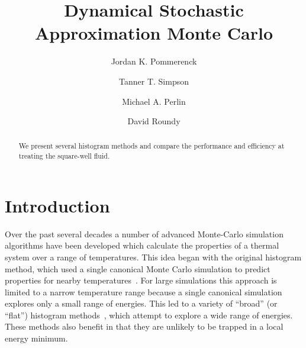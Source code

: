 \documentclass[letterpaper,twocolumn,amsmath,amssymb,pre,aps,10pt]{revtex4-1}
\begin{document}
\title{Dynamical Stochastic Approximation Monte Carlo}

\author{Jordan K. Pommerenck} \author{Tanner T. Simpson}
\author{Michael A. Perlin} \author{David Roundy}

\begin{abstract}
  We present several histogram methods and compare the performance and efficiency at treating the square-well fluid.
\end{abstract}

\maketitle

\section{Introduction}
Over the past several decades a number of advanced Monte-Carlo
simulation algorithms have been developed which calculate the
properties of a thermal system over a range of temperatures.  This
idea began with the original histogram method, which used a single
canonical Monte Carlo simulation to predict properties for nearby
temperatures~\cite{ferrenberg1988new}.  For large simulations this
approach is limited to a narrow temperature range because a single
canonical simulation explores only a small range of energies.  This
led to a variety of ``broad'' (or ``flat'') histogram
methods~\cite{penna1996broad, penna1998broad, swendsen1999transition,
  wang2001determining, wang2001efficient, trebst2004optimizing}, which
attempt to explore a wide range of energies.  These methods also
benefit in that they are unlikely to be trapped in a local energy
minimum.
\end{document}

